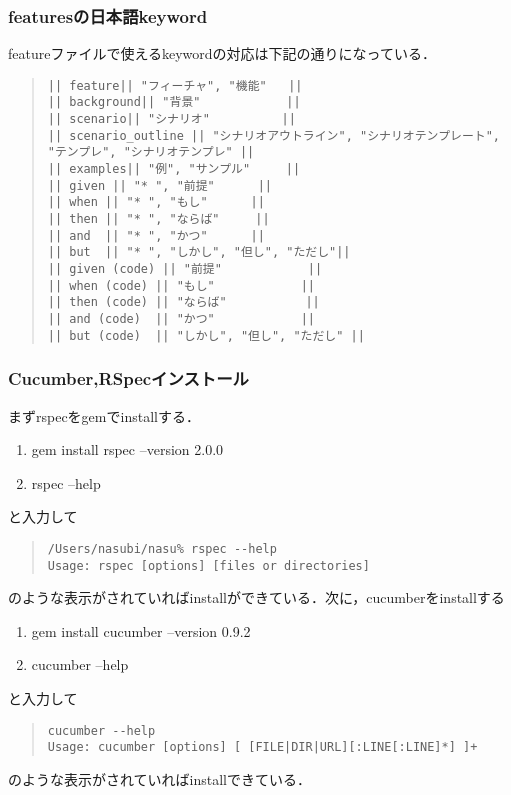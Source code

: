 \subsubsection{featuresの日本語keyword}
featureファイルで使えるkeywordの対応は下記の通りになっている．
\begin{quote}\begin{verbatim}
|| feature|| "フィーチャ", "機能"   ||
|| background|| "背景"            ||
|| scenario|| "シナリオ"          ||
|| scenario_outline || "シナリオアウトライン", "シナリオテンプレート", "テンプレ", "シナリオテンプレ" ||
|| examples|| "例", "サンプル"     ||
|| given || "* ", "前提"      ||
|| when || "* ", "もし"      ||
|| then || "* ", "ならば"     ||
|| and  || "* ", "かつ"      ||
|| but  || "* ", "しかし", "但し", "ただし"||
|| given (code) || "前提"            ||
|| when (code) || "もし"            ||
|| then (code) || "ならば"           ||
|| and (code)  || "かつ"            ||
|| but (code)  || "しかし", "但し", "ただし" ||
\end{verbatim}\end{quote}
\subsubsection{Cucumber,RSpecインストール}
まずrspecをgemでinstallする．

\begin{enumerate}
\item gem install rspec --version 2.0.0
\item rspec --help
\end{enumerate}
と入力して
\begin{quote}\begin{verbatim}
/Users/nasubi/nasu% rspec --help
Usage: rspec [options] [files or directories]
\end{verbatim}\end{quote}
のような表示がされていればinstallができている．次に，cucumberをinstallする

\begin{enumerate}
\item gem install cucumber --version 0.9.2
\item cucumber --help
\end{enumerate}
と入力して
\begin{quote}\begin{verbatim}
cucumber --help
Usage: cucumber [options] [ [FILE|DIR|URL][:LINE[:LINE]*] ]+
\end{verbatim}\end{quote}
のような表示がされていればinstallできている．

